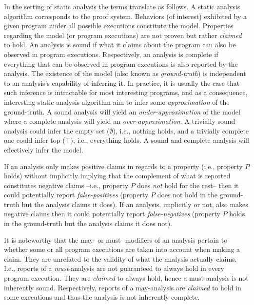 In the setting of static analysis the terms translate as follows. A static analysis algorithm corresponds to the proof system. Behaviors (of interest) exhibited by a given program under all possible executions constitute the model. Properties regarding the model (or program executions) are not proven but rather \emph{claimed} to hold. An analysis is sound if what it claims about the program can also be observed in program executions. Respectively, an analysis is complete if everything that can be observed in program executions is also reported by the analysis. The existence of the model (also known as \emph{ground-truth}) is independent to an analysis's capability of inferring it. In practice, it is usually the case that such inference is intractable for most interesting programs, and as a consequence, interesting static analysis algorithm aim to infer some \emph{approximation} of the ground-truth. A sound analysis will yield an \emph{under-approximation} of the model where a complete analysis will yield an \emph{over-approximation}. A trivially sound analysis could infer the empty set ($\emptyset$), i.e., nothing holds, and a trivially complete one could infer top ($\top$), i.e., everything holds. A sound and complete analysis will effectively infer the model.

If an analysis only makes positive claims in regards to a property (i.e., property $P$ holds) without implicitly implying that the complement of what is reported constitutes negative claims --i.e., property $P$ does \emph{not} hold for the rest-- then it could potentially report \emph{false-positives} (property $P$ does not hold in the ground-truth but the analysis claims it does). If an analysis, implicitly or not, also makes negative claims then it could potentially report \emph{false-negatives} (property $P$ holds in the ground-truth but the analysis claims it does not).

It is noteworthy that the may- or must- modifiers of an analysis pertain to whether some or all program executions are taken into account when making a claim. They are unrelated to the validity of what the analysis actually claims. I.e., reports of a \emph{must}-analysis are not guaranteed to always hold in every program execution. They are \emph{claimed} to always hold, hence a must-analysis is not inherently sound. Respectively, reports of a may-analysis are \emph{claimed} to hold in some executions and thus the analysis is not inherently complete.

